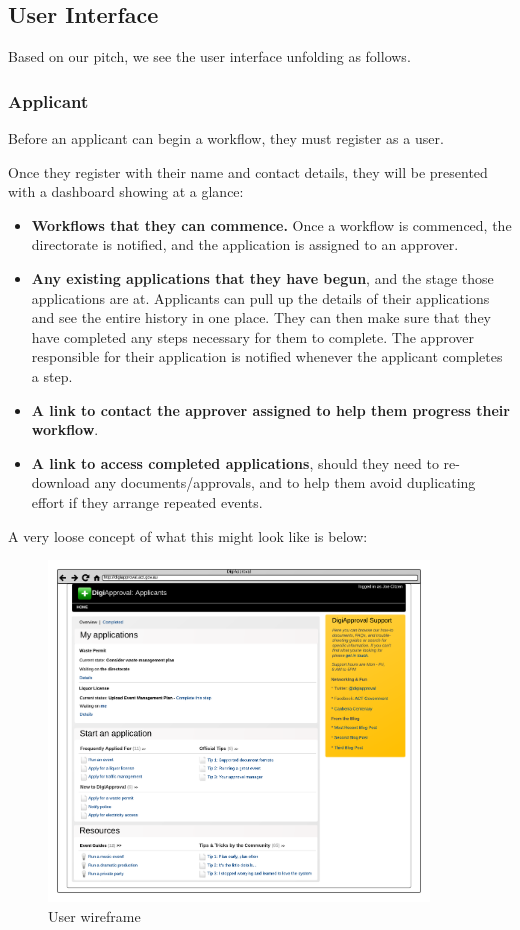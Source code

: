 \documentclass[12pt,a4paper,twosided]{article}
\begin{document}
\subsection{User Interface}

Based on our pitch, we see the user interface unfolding as follows.

\subsubsection{Applicant}

Before an applicant can begin a workflow, they must register as a user.

Once they register with their name and contact details, they will be
presented with a dashboard showing at a glance:

\begin{itemize}
\itemsep1pt\parskip0pt
\item
  \textbf{Workflows that they can commence.} Once a workflow is
  commenced, the directorate is notified, and the application is
  assigned to an approver.
\item
  \textbf{Any existing applications that they have begun}, and the stage
  those applications are at. Applicants can pull up the details of their
  applications and see the entire history in one place. They can then
  make sure that they have completed any steps necessary for them to
  complete. The approver responsible for their application is notified
  whenever the applicant completes a step.
\item
  \textbf{A link to contact the approver assigned to help them progress
  their workflow}.
\item
  \textbf{A link to access completed applications}, should they need to
  re-download any documents/approvals, and to help them avoid
  duplicating effort if they arrange repeated events.
\end{itemize}

A very loose concept of what this might look like is below:

\begin{figure}[htbp]
\centering
\includegraphics[width=0.9\textwidth]{./imgs/user-wireframe.png}
\caption{User wireframe}
\end{figure}
\end{document}
